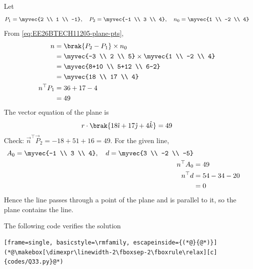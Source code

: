\begin{enumerate}[label=\thesubsection.\arabic*, ref=\thesubsection.\theenumi, itemsep=3ex]
\medskip
\solution Let
\begin{align}
	\vec{P}_1 = \myvec{2 \\ 1 \\ -1}, \quad \vec{P}_2 = \myvec{-1 \\ 3 \\ 4}, \quad \vec{n}_0 = \myvec{1 \\ -2 \\ 4}
\end{align}
From \eqref{eq:EE26BTECH11205-plane-pts},
\begin{align}
	\vec{n} &= \brak{\vec{P}_2 - \vec{P}_1}\times\vec{n}_0 \notag
	\\
	&= \myvec{-3 \\ 2 \\ 5}\times\myvec{1 \\ -2 \\ 4} \notag
	\\
	&= \myvec{8+10 \\ 5+12 \\ 6-2} \notag
	\\
	&= \myvec{18 \\ 17 \\ 4}
	\\
	\vec{n}^{\top}\vec{P}_1 &= 36 + 17 - 4 \notag
	\\
	&= 49
\end{align}
The vector equation of the plane is
\begin{align}
	\vec{r}\cdot\brak{18\hat{\imath} + 17\hat{\jmath} + 4\hat{k}} = 49
\end{align}
Check: $\vec{n}^{\top}\vec{P}_2 = -18 + 51 + 16 = 49$. For the given line,
\begin{align}
	\vec{A}_0 = \myvec{-1 \\ 3 \\ 4}, \quad \vec{d} = \myvec{3 \\ -2 \\ -5}
	\\
	\vec{n}^{\top}\vec{A}_0 &= 49
	\\
	\vec{n}^{\top}\vec{d} &= 54 - 34 - 20 \notag
	\\
	&= 0
\end{align}
Hence the line passes through a point of the plane and is parallel to it, so the plane contains the line.

\medskip
The following code verifies the solution
\begin{lstlisting}[frame=single, basicstyle=\rmfamily, escapeinside={(*@}{@*)}]
(*@\makebox[\dimexpr\linewidth-2\fboxsep-2\fboxrule\relax][c]{codes/Q33.py}@*)
\end{lstlisting}


\end{enumerate}
